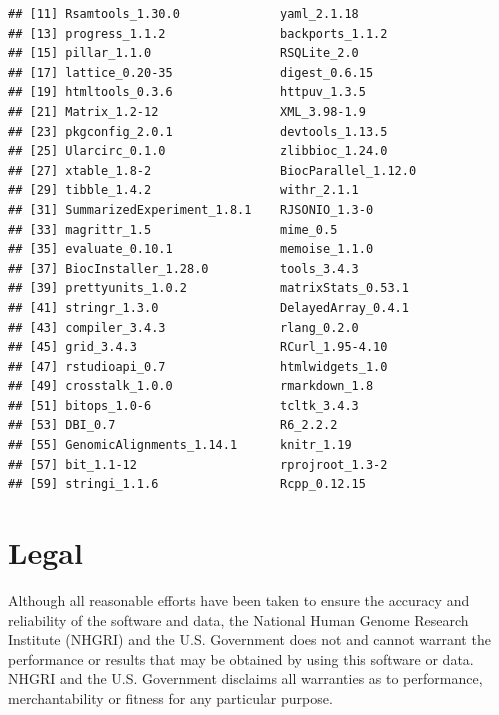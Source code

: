 \documentclass[12pt]{article}\usepackage[]{graphicx}\usepackage[]{color}
\makeatletter
\newenvironment{kframe}{%
 \def\at@end@of@kframe{}%
 \ifinner\ifhmode%
  \def\at@end@of@kframe{\end{minipage}}%
  \begin{minipage}{\columnwidth}%
 \fi\fi%
 \def\FrameCommand##1{\hskip\@totalleftmargin \hskip-\fboxsep
 \colorbox{shadecolor}{##1}\hskip-\fboxsep
     \hskip-\linewidth \hskip-\@totalleftmargin \hskip\columnwidth}%
 \MakeFramed {\advance\hsize-\width
   \@totalleftmargin\z@ \linewidth\hsize
   \@setminipage}}%
 {\par\unskip\endMakeFramed%
 \at@end@of@kframe}
\newenvironment{knitrout}{}{} %
\makeatother
\begin{document}
\begin{knitrout}
\begin{kframe}
\begin{verbatim}
## [11] Rsamtools_1.30.0              yaml_2.1.18                  
## [13] progress_1.1.2                backports_1.1.2              
## [15] pillar_1.1.0                  RSQLite_2.0                  
## [17] lattice_0.20-35               digest_0.6.15                
## [19] htmltools_0.3.6               httpuv_1.3.5                 
## [21] Matrix_1.2-12                 XML_3.98-1.9                 
## [23] pkgconfig_2.0.1               devtools_1.13.5              
## [25] Ularcirc_0.1.0                zlibbioc_1.24.0              
## [27] xtable_1.8-2                  BiocParallel_1.12.0          
## [29] tibble_1.4.2                  withr_2.1.1                  
## [31] SummarizedExperiment_1.8.1    RJSONIO_1.3-0                
## [33] magrittr_1.5                  mime_0.5                     
## [35] evaluate_0.10.1               memoise_1.1.0                
## [37] BiocInstaller_1.28.0          tools_3.4.3                  
## [39] prettyunits_1.0.2             matrixStats_0.53.1           
## [41] stringr_1.3.0                 DelayedArray_0.4.1           
## [43] compiler_3.4.3                rlang_0.2.0                  
## [45] grid_3.4.3                    RCurl_1.95-4.10              
## [47] rstudioapi_0.7                htmlwidgets_1.0              
## [49] crosstalk_1.0.0               rmarkdown_1.8                
## [51] bitops_1.0-6                  tcltk_3.4.3                  
## [53] DBI_0.7                       R6_2.2.2                     
## [55] GenomicAlignments_1.14.1      knitr_1.19                   
## [57] bit_1.1-12                    rprojroot_1.3-2              
## [59] stringi_1.1.6                 Rcpp_0.12.15
\end{verbatim}
\end{kframe}
\end{knitrout}

\section{Legal} \label{sec:legal}


Although all reasonable efforts have been taken to ensure the
accuracy and reliability of the software and data, the National
Human Genome Research Institute (NHGRI) and the U.S. Government
does not and cannot warrant the performance or results that may
be obtained by using this software or data.  NHGRI and the U.S.
Government disclaims all warranties as to performance,
merchantability or fitness for any particular purpose.

\end{document}
